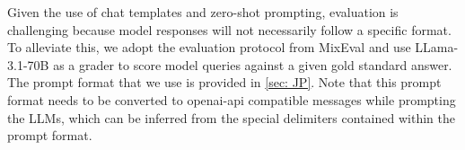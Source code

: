 Given the use of chat templates and zero-shot prompting, evaluation is challenging because model responses will not necessarily follow a specific format. To alleviate this, we adopt the evaluation protocol from MixEval \citep{ni2024mixeval} and use LLama-3.1-70B as a grader to score model queries against a given gold standard answer. The prompt format that we use is provided in \ref{sec: JP}. Note that this prompt format needs to be converted to openai-api compatible messages while prompting the LLMs, which can be inferred from the special delimiters contained within the prompt format.




